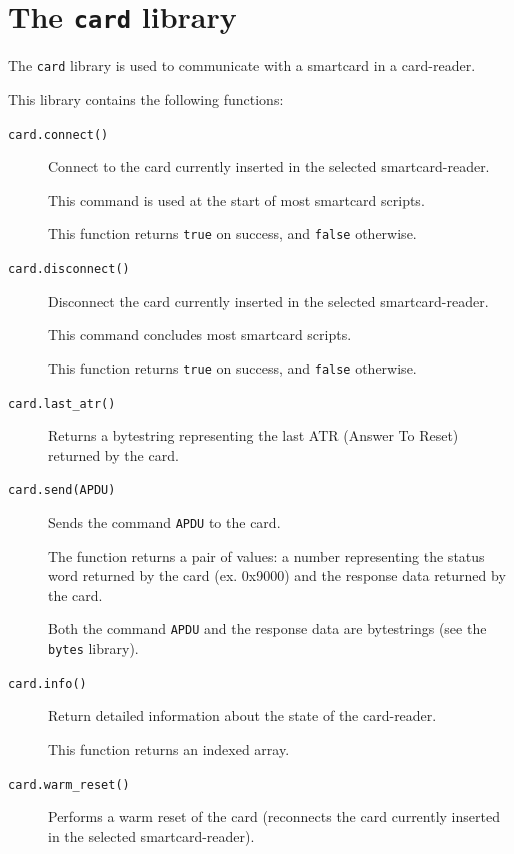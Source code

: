 \documentclass[11pt]{report}
\begin{document}
\section{The \texttt{card} library}

The \texttt{card} library is used to communicate with a smartcard in a card-reader.

This library contains the following functions:

\begin{description}

\item[\texttt{card.connect()}]
{
  Connect to the card currently inserted in the selected smartcard-reader. 

  This command is used at the start of most smartcard scripts.

  This function returns \texttt{true} on success, and \texttt{false} otherwise.
}

\item[\texttt{card.disconnect()}]
{
  Disconnect the card currently inserted in the selected smartcard-reader.
	  
  This command concludes most smartcard scripts.

  This function returns \texttt{true} on success, and \texttt{false} otherwise.
}

\item[\texttt{card.last\_atr()}]
{
  Returns a bytestring representing the last ATR (Answer To Reset) returned by the card.
}

\item[\texttt{card.send(APDU)}]
{
  Sends the command \texttt{APDU} to the card. 

  The function returns a pair of values: a number representing the status word 
  returned by the card (ex. 0x9000) and the response data returned by the card.
  
  Both the command \texttt{APDU} and the response data are bytestrings 
  (see the \texttt{bytes} library).
}

\item[\texttt{card.info()}]
{
  Return detailed information about the state of the card-reader.

  This function returns an indexed array.
}

\item[\texttt{card.warm\_reset()}]
{
  Performs a warm reset of the card 
  (reconnects the card currently inserted in the selected smartcard-reader).
}

\end{description}
\end{document}
